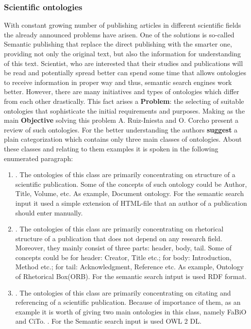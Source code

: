 		\subsubsection{Scientific ontologies}
		With constant growing number of publishing articles in different scientific fields the already announced problems have arisen. One of the solutions is so-called Semantic publishing that replace the direct publishing with the smarter one, providing not only the original text, but also the information for understanding of this text. Scientist, who are interested that their studies and publications will be read and potentially spread better can spend some time that allows ontologies to receive information in proper way and thus, semantic search engines work better. However, there are many initiatives and types of ontologies which differ from each other drastically. This fact arises a \textbf{Problem}: the selecting of suitable ontologies that sophisticate the initial requirements and purposes. Making as the main \textbf{Objective} solving this problem A. Ruiz-Iniesta and O. Corcho present a review of such ontologies\cite{Cor14}.
		For the better understanding the authors \textbf{suggest} a plain categorization which contains only three main classes of ontologies. About these classes and relating to them examples it is spoken in the following enumerated paragraph:
			\begin{enumerate}
				\item {}\frqq. The ontologies of this class are primarily concentrating on structure of a scientific publication. Some of the concepts of such ontology could be Author, Title, Volume, etc. As example, Document ontology. For the semantic search input it used a simple extension of HTML-file that an author of a publication should enter manually.
				
				\item {}\frqq. The ontologies of this class are primarily concentrating on rhetorical structure of a publication that does not depend on any research field. Moreover, they mainly consist of three parts: header, body, tail. Some of concepts could be for header: Creator, Title etc.; for body: Introduction, Method etc.; for tail: Acknowledgment, Reference etc. As example, Ontology of Rhetorical Box(ORB). For the semantic search intput is used RDF format.  
				
				\item {}\frqq.  The ontologies of this class are primarily concentrating on citating and referencing of a scientific publication. Because of importance of them, as an example it is worth of giving two main ontologies in this class, namely FaBiO and CiTo. \frqq\cite{Per12}. For the Semantic search input is used OWL 2 DL. 
			\end{enumerate}
